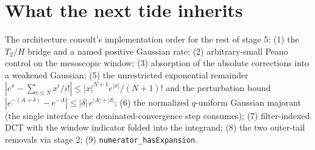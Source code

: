 \documentclass[11pt]{article}
\newcommand{\code}[1]{\texttt{#1}}
\begin{document}
\section{What the next tide inherits}

The architecture consult's implementation order for the rest of
stage 5: (1) the $T_2/H$ bridge and a named positive Gaussian rate;
(2) arbitrary-small Peano control on the mesoscopic window;
(3) absorption of the absolute corrections into a weakened Gaussian;
(5) the unrestricted exponential remainder
$|e^x - \sum_{i \le N} x^i/i!| \le |x|^{N+1} e^{|x|}/(N{+}1)!$ and
the perturbation bound $|e^{-(A+\delta)} - e^{-A}| \le |\delta|\,
e^{|A|+|\delta|}$; (6) the normalized $q$-uniform Gaussian majorant
(the single interface the dominated-convergence step consumes);
(7) filter-indexed DCT with the window indicator folded into the
integrand; (8) the two outer-tail removals via stage 2;
(9) \code{numerator\_hasExpansion}.
\end{document}
